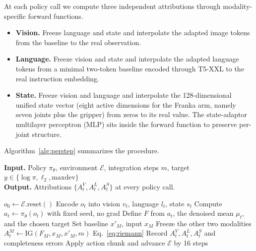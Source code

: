 \documentclass{article}
\begin{document}
At each policy call we compute three independent attributions through modality-specific forward functions.
\begin{itemize}
\item \textbf{Vision.} Freeze language and state and interpolate the adapted image tokens from the baseline to the real observation.
\item \textbf{Language.} Freeze vision and state and interpolate the adapted language tokens from a minimal two-token baseline encoded through T5-XXL to the real instruction embedding.
\item \textbf{State.} Freeze vision and language and interpolate the 128-dimensional unified state vector (eight active dimensions for the Franka arm, namely seven joints plus the gripper) from zeros to its real value. The state-adaptor multilayer perceptron (MLP) sits inside the forward function to preserve per-joint structure.
\end{itemize}
Algorithm~\ref{alg:perstep} summarizes the procedure.

\begin{algorithm}[t]
\caption{Per-step IG for diffusion-policy VLAs.}
\label{alg:perstep}
\textbf{Input.} Policy $\pi_\theta$, environment $\mathcal{E}$, integration steps $m$, target $y \in \{\log\pi, \ell_2, \mathrm{maxdev}\}$\\
\textbf{Output.} Attributions $\{A_t^V, A_t^L, A_t^S\}$ at every policy call.
\begin{algorithmic}[1]
\STATE $o_0 \leftarrow \mathcal{E}.\text{reset}()$
    \STATE Encode $o_t$ into vision $v_t$, language $l_t$, state $s_t$
    \STATE Compute $a_t \leftarrow \pi_\theta(o_t)$ with fixed seed, no grad
    \STATE Define $F$ from $a_t$, the denoised mean $\mu_t$, and the chosen target
        \STATE Set baseline $x'_M$, input $x_M$
        \STATE Freeze the other two modalities
        \STATE $A_t^M \leftarrow \text{IG}(F_M, x_M, x'_M, m)$ \hfill Eq.~\ref{eq:riemann}
    \ENDFOR
    \STATE Record $A_t^V, A_t^L, A_t^S$ and completeness errors
    \STATE Apply action chunk and advance $\mathcal{E}$ by 16 steps
\ENDFOR
\end{algorithmic}
\end{algorithm}
\end{document}
